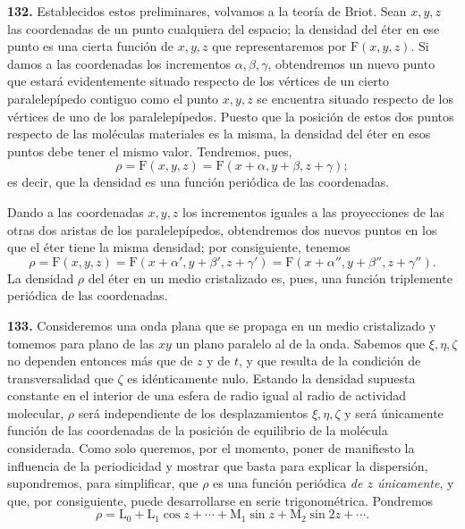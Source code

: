\noindent\textbf{132.} Establecidos estos preliminares, volvamos a la
teoría de Briot. Sean $x,y,z$ las coordenadas de un punto cualquiera del
espacio; la densidad del éter en ese punto es una cierta función de
$x,y,z$ que representaremos por $\mathrm F(x,y,z)$. Si damos a las
coordenadas los incrementos $\alpha,\beta,\gamma$, obtendremos un nuevo
punto que estará evidentemente situado respecto de los vértices de un
cierto paralelepípedo contiguo como el punto $x,y,z$ se encuentra situado
respecto de los vértices de uno de los paralelepípedos. Puesto que la
posición de estos dos puntos respecto de las moléculas materiales es la
misma, la densidad del éter en esos puntos debe tener el mismo valor.
Tendremos, pues,
\[
\rho=\mathrm F(x,y,z)=\mathrm F(x+\alpha,y+\beta,z+\gamma);
\]
es decir, que la densidad es una función periódica de las coordenadas.

Dando a las coordenadas $x,y,z$ los incrementos iguales a las proyecciones
de las otras dos aristas de los paralelepípedos, obtendremos dos nuevos
puntos en los que el éter tiene la misma densidad; por consiguiente,
tenemos
\[
\rho=\mathrm F(x,y,z)=\mathrm F(x+\alpha',y+\beta',z+\gamma')
=\mathrm F(x+\alpha'',y+\beta'',z+\gamma'').
\]
La densidad $\rho$ del éter en un medio cristalizado es, pues, una función
triplemente periódica de las coordenadas.

\noindent\textbf{133.} Consideremos una onda plana que se propaga en un
medio cristalizado y tomemos para plano de las $xy$ un plano paralelo al
de la onda. Sabemos que $\xi,\eta,\zeta$ no dependen entonces más que de
$z$ y de $t$, y que resulta de la condición de transversalidad que
$\zeta$ es idénticamente nulo. Estando la densidad supuesta constante en
el interior de una esfera de radio igual al radio de actividad molecular,
$\rho$ será independiente de los desplazamientos $\xi,\eta,\zeta$ y será
únicamente función de las coordenadas de la posición de equilibrio de la
molécula considerada. Como solo queremos, por el momento, poner de
manifiesto la influencia de la periodicidad y mostrar que basta para
explicar la dispersión, supondremos, para simplificar, que $\rho$ es una
función periódica \emph{de $z$ únicamente}, y que, por consiguiente, puede
desarrollarse en serie trigonométrica. Pondremos
\[
\rho=\mathrm L_0+\mathrm L_1\cos z+\cdots+\mathrm M_1\sin z
+\mathrm M_2\sin 2z+\cdots.
\]

